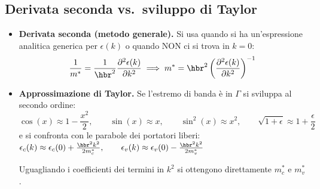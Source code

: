 \subsection{Derivata seconda vs.\ sviluppo di Taylor}

\begin{itemize}
    \item \textbf{Derivata seconda (metodo generale).} Si usa quando si ha un'espressione analitica generica per $\epsilon(k)$ o quando NON ci si trova in $k=0$:
\[ \frac{1}{m^*} = \frac{1}{\hbr^2}\frac{\partial^2\epsilon(k)}{\partial k^2} \implies m^*=\hbr^2\left(\frac{\partial^2\epsilon(k)}{\partial k^2}\right)^{-1} \]
\item \textbf{Approssimazione di Taylor.} Se l'estremo di banda è in $\Gamma$ si sviluppa al secondo ordine:
\[ \cos(x)\approx1-\frac{x^2}{2}, \qquad \sin(x)\approx x, \qquad \sin^2(x)\approx x^2, \qquad \sqrt{1+\epsilon}\approx1+\frac\epsilon2 \]
e si confronta con le parabole dei portatori liberi: $\epsilon_c(k)\approx\epsilon_c(0)+\frac{\hbr^2k^2}{2m_c^*}, \qquad \epsilon_v(k)\approx\epsilon_v(0)-\frac{\hbr^2k^2}{2m_v^*} $

Uguagliando i coefficienti dei termini in $k^2$ si ottengono direttamente $m_c^*$ e $m_v^*$.
\end{itemize}




